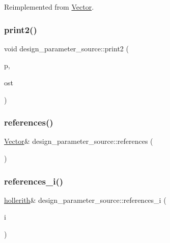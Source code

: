 Reimplemented from \mbox{\hyperlink{class_vector_a71d7e24bcfdfc69d4a2137360acb066c}{Vector}}.

\mbox{\label{classdesign__parameter__source_a5e22836b470986f95bfcb322dfc37e82}} 
\subsubsection{\texorpdfstring{print2()}{print2()}}
{\footnotesize\ttfamily void design\+\_\+parameter\+\_\+source\+::print2 (\begin{DoxyParamCaption}\item[{\mbox{\hyperlink{classdesign__parameter}{design\+\_\+parameter}} \&}]{p,  }\item[{ostream \&}]{ost }\end{DoxyParamCaption})}

\mbox{\label{classdesign__parameter__source_a012c498e42726a45397509d9c2fadf64}} 
\subsubsection{\texorpdfstring{references()}{references()}}
{\footnotesize\ttfamily \mbox{\hyperlink{class_vector}{Vector}}\& design\+\_\+parameter\+\_\+source\+::references (\begin{DoxyParamCaption}{ }\end{DoxyParamCaption})\hspace{0.3cm}{\ttfamily [inline]}}

\mbox{\label{classdesign__parameter__source_ac47d57aab93b6dcc781d27c6cec0fe6e}} 
\subsubsection{\texorpdfstring{references\+\_\+i()}{references\_i()}}
{\footnotesize\ttfamily \mbox{\hyperlink{classhollerith}{hollerith}}\& design\+\_\+parameter\+\_\+source\+::references\+\_\+i (\begin{DoxyParamCaption}\item[{\mbox{\hyperlink{galois_8h_a09fddde158a3a20bd2dcadb609de11dc}{I\+NT}}}]{i }\end{DoxyParamCaption})\hspace{0.3cm}{\ttfamily [inline]}}

